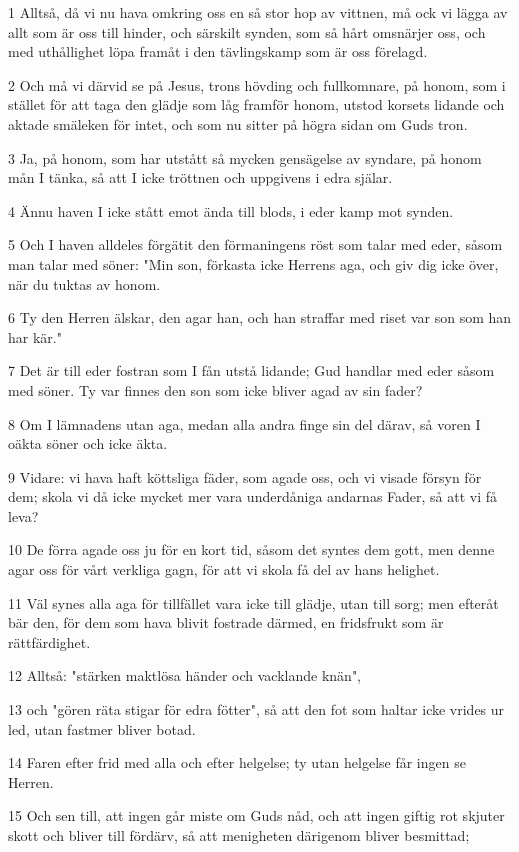 \par 1 Alltså, då vi nu hava omkring oss en så stor hop av vittnen, må ock vi lägga av allt som är oss till hinder, och särskilt synden, som så hårt omsnärjer oss, och med uthållighet löpa framåt i den tävlingskamp som är oss förelagd.
\par 2 Och må vi därvid se på Jesus, trons hövding och fullkomnare, på honom, som i stället för att taga den glädje som låg framför honom, utstod korsets lidande och aktade smäleken för intet, och som nu sitter på högra sidan om Guds tron.
\par 3 Ja, på honom, som har utstått så mycken gensägelse av syndare, på honom mån I tänka, så att I icke tröttnen och uppgivens i edra själar.
\par 4 Ännu haven I icke stått emot ända till blods, i eder kamp mot synden.
\par 5 Och I haven alldeles förgätit den förmaningens röst som talar med eder, såsom man talar med söner: "Min son, förkasta icke Herrens aga, och giv dig icke över, när du tuktas av honom.
\par 6 Ty den Herren älskar, den agar han, och han straffar med riset var son som han har kär."
\par 7 Det är till eder fostran som I fån utstå lidande; Gud handlar med eder såsom med söner. Ty var finnes den son som icke bliver agad av sin fader?
\par 8 Om I lämnadens utan aga, medan alla andra finge sin del därav, så voren I oäkta söner och icke äkta.
\par 9 Vidare: vi hava haft köttsliga fäder, som agade oss, och vi visade försyn för dem; skola vi då icke mycket mer vara underdåniga andarnas Fader, så att vi få leva?
\par 10 De förra agade oss ju för en kort tid, såsom det syntes dem gott, men denne agar oss för vårt verkliga gagn, för att vi skola få del av hans helighet.
\par 11 Väl synes alla aga för tillfället vara icke till glädje, utan till sorg; men efteråt bär den, för dem som hava blivit fostrade därmed, en fridsfrukt som är rättfärdighet.
\par 12 Alltså: "stärken maktlösa händer och vacklande knän",
\par 13 och "gören räta stigar för edra fötter", så att den fot som haltar icke vrides ur led, utan fastmer bliver botad.
\par 14 Faren efter frid med alla och efter helgelse; ty utan helgelse får ingen se Herren.
\par 15 Och sen till, att ingen går miste om Guds nåd, och att ingen giftig rot skjuter skott och bliver till fördärv, så att menigheten därigenom bliver besmittad;
